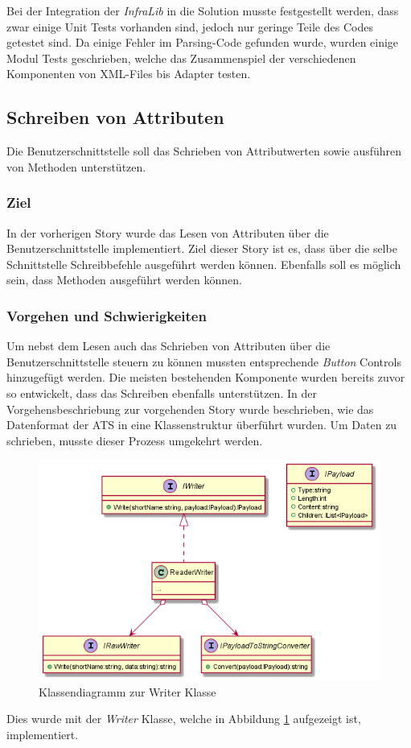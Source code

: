 Bei der Integration der \textit{InfraLib} in die Solution musste festgestellt werden, dass zwar einige Unit Tests vorhanden sind, jedoch nur geringe Teile des Codes getestet sind.
Da einige Fehler im Parsing-Code gefunden wurde, wurden einige Modul Tests geschrieben, welche das Zusammenspiel der verschiedenen Komponenten von XML-Files bis Adapter testen.


\subsection{Schreiben von Attributen}
\dq  Die Benutzerschnittstelle soll das Schrieben von Attributwerten sowie ausführen von Methoden unterstützen.\dq

\subsubsection{Ziel}
In der vorherigen Story wurde das Lesen von Attributen über die Benutzerschnittstelle implementiert.
Ziel dieser Story ist es, dass über die selbe Schnittstelle Schreibbefehle ausgeführt werden können.
Ebenfalls soll es möglich sein, dass Methoden ausgeführt werden können.

\subsubsection{Vorgehen und Schwierigkeiten}
Um nebst dem Lesen auch das Schrieben von Attributen über die Benutzerschnittstelle steuern zu können mussten entsprechende \textit{Button} Controls hinzugefügt werden.
Die meisten bestehenden Komponente wurden bereits zuvor so entwickelt, dass das Schreiben ebenfalls unterstützen.
In der Vorgehensbeschriebung zur vorgehenden Story wurde beschrieben, wie das Datenformat der \ac{ATS} in eine Klassenstruktur überführt wurden.
Um Daten zu schrieben, musste dieser Prozess umgekehrt werden.

\begin{figure}
   \centering
   \includegraphics[width=1.0\textwidth]{gfx/payloadTostriing.png}
   \caption{
      Klassendiagramm zur Writer Klasse
      }
      \label{fig:writer}
   \end{figure}
Dies wurde mit der \textit{Writer} Klasse, welche in Abbildung \ref{fig:writer} aufgezeigt ist, implementiert.

